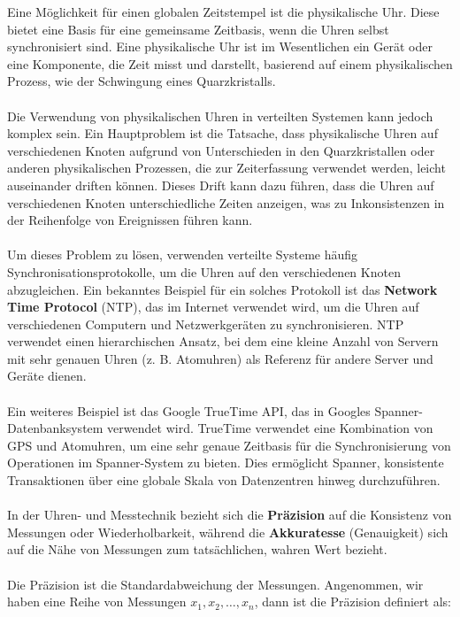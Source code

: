 Eine Möglichkeit für einen globalen Zeitstempel ist die physikalische Uhr. Diese bietet eine Basis für eine gemeinsame Zeitbasis, wenn die Uhren selbst synchronisiert sind. Eine physikalische Uhr ist im Wesentlichen ein Gerät oder eine Komponente, die Zeit misst und darstellt, basierend auf einem physikalischen Prozess, wie der Schwingung eines Quarzkristalls.
\\\\
Die Verwendung von physikalischen Uhren in verteilten Systemen kann jedoch komplex sein. Ein Hauptproblem ist die Tatsache, dass physikalische Uhren auf verschiedenen Knoten aufgrund von Unterschieden in den Quarzkristallen oder anderen physikalischen Prozessen, die zur Zeiterfassung verwendet werden, leicht auseinander driften können. Dieses Drift kann dazu führen, dass die Uhren auf verschiedenen Knoten unterschiedliche Zeiten anzeigen, was zu Inkonsistenzen in der Reihenfolge von Ereignissen führen kann.
\\\\
Um dieses Problem zu lösen, verwenden verteilte Systeme häufig Synchronisationsprotokolle, um die Uhren auf den verschiedenen Knoten abzugleichen. Ein bekanntes Beispiel für ein solches Protokoll ist das \textbf{Network Time Protocol} (NTP), das im Internet verwendet wird, um die Uhren auf verschiedenen Computern und Netzwerkgeräten zu synchronisieren. NTP verwendet einen hierarchischen Ansatz, bei dem eine kleine Anzahl von Servern mit sehr genauen Uhren (z. B. Atomuhren) als Referenz für andere Server und Geräte dienen.
\\\\
Ein weiteres Beispiel ist das Google TrueTime API, das in Googles Spanner-Datenbanksystem verwendet wird. TrueTime verwendet eine Kombination von GPS und Atomuhren, um eine sehr genaue Zeitbasis für die Synchronisierung von Operationen im Spanner-System zu bieten. Dies ermöglicht Spanner, konsistente Transaktionen über eine globale Skala von Datenzentren hinweg durchzuführen.
\\\\
In der Uhren- und Messtechnik bezieht sich die \textbf{Präzision} auf die Konsistenz von Messungen oder Wiederholbarkeit, während die \textbf{Akkuratesse} (Genauigkeit) sich auf die Nähe von Messungen zum tatsächlichen, wahren Wert bezieht.
\\\\
Die Präzision ist die Standardabweichung der Messungen. Angenommen, wir haben eine Reihe von Messungen $x_1, x_2, \ldots, x_n$, dann ist die Präzision definiert als:
